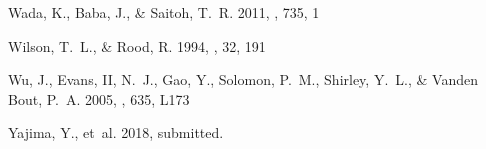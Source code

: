 \documentclass[proof]{pasj01}
\begin{document}
\begin{thebibliography}{}
{Wada}, K., {Baba}, J., \& {Saitoh}, T.~R. 2011, \apj, 735, 1

{Wilson}, T.~L., \& {Rood}, R. 1994, \araa, 32, 191

{Wu}, J., {Evans}, II, N.~J., {Gao}, Y., {Solomon}, P.~M., {Shirley}, Y.~L., \&
  {Vanden Bout}, P.~A. 2005, \apjl, 635, L173

{Yajima}, Y., {et~al.} 2018, submitted.

\end{thebibliography}


\end{document}
